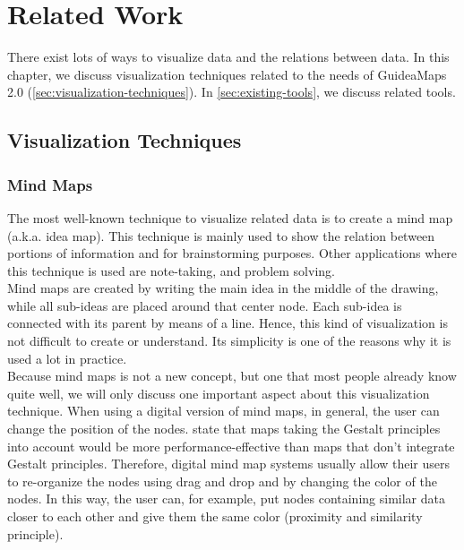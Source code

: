 \chapter{Related Work}\label{ch:related-work}

There exist lots of ways to visualize data and the relations between data. In this chapter, we discuss visualization techniques related to the needs of GuideaMaps 2.0 (\autoref{sec:visualization-techniques}). In \autoref{sec:existing-tools}, we discuss related tools.


\section{Visualization Techniques}\label{sec:visualization-techniques}

\subsection{Mind Maps}\label{sec:mind-maps}
The most well-known technique to visualize related data is to create a mind map (a.k.a. idea map). This technique is mainly used to show the relation between portions of information and for brainstorming purposes. Other applications where this technique is used are note-taking, and problem solving. \citep{knowledgemapsbalaid} \\

Mind maps are created by writing the main idea in the middle of the drawing, while all sub-ideas are placed around that center node. Each sub-idea is connected with its parent by means of a line. Hence, this kind of visualization is not difficult to create or understand. Its simplicity is one of the reasons why it is used a lot in practice.\\

Because mind maps is not a new concept, but one that most people already know quite well, we will only discuss one important aspect about this visualization technique. When using a digital version of mind maps, in general, the user can change the position of the nodes. \cite{wiegmann-1992} state that maps taking the Gestalt principles \citep{koffka2013principles} into account would be more performance-effective than maps that don't integrate Gestalt principles. Therefore, digital mind map systems usually allow their users to re-organize the nodes using drag and drop and by changing the color of the nodes. In this way, the user can, for example, put nodes containing similar data closer to each other and give them the same color (proximity and similarity principle).



